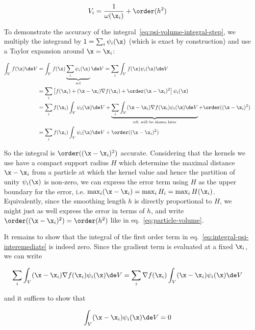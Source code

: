 \begin{align}
    V_i = \frac{1}{\omega(\x_i)} + \order(h^2) \label{eq:particle-volume}
\end{align}

To demonstrate the accuracy of the integral~\ref{eq:psi-volume-integral-step}, we multiply the
integrand by $1 = \sum_i \psi_i(\x)$ (which is exact by construction) and use a Taylor expansion
around $\x = \x_i$:

\begin{align}
    \int_V f(\x) \de V
        &= \int_V f(\x) \underbrace{\sum_i \psi_i(\x)}_{= 1} \de V
        = \sum_i \int_V f(\x) \psi_i(\x) \de V \\
        &= \sum_i \left[
            f(\x_i) + (\x - \x_i)\nabla f(\x_i) + \order(\x - \x_i)^2
            \right] \psi_i (\x) \\
        &= \sum_i f(\x_i) \int_V \psi_i(\x) \de V +
            \underbrace{\sum_i \int_V (\x - \x_i) \nabla f(\x_i) \psi_i(\x) \de V}_{=0 \text{, will
be shown later}} + \order((\x - \x_i)^2) \label{eq:integral-psi-interemediate}\\
        &= \sum_i f(\x_i) \int_V \psi_i(\x) \de V + \order((\x - \x_i)^2)
\end{align}


So the integral is $\order((\x - \x_i)^2)$ accurate. Considering that the kernels we use have a
compact support radius $H$ which determine the maximal distance $\x - \x_i$ from a particle at
which the kernel value and hence the partition of unity $\psi_i(\x)$ is non-zero, we can express
the error term using $H$ as the upper boundary for the error, i.e. $\max_i (\x - \x_i) = \max_i H_i
= \max_i H(\x_i)$. Equivalently, since the smoothing length $h$ is directly proportional to $H$, we
might just as well express the error in terms of $h$, and write $\order((\x - \x_i)^2) =
\order(h^2)$ like in eq.~\ref{eq:particle-volume}.

It remains to show that the integral of the first order term in
eq.~\ref{eq:integral-psi-interemediate} is indeed zero. Since the gradient term is evaluated at a
fixed $\x_i$, we can write

\begin{align}
    \sum_i \int_V (\x - \x_i) \nabla f(\x_i) \psi_i(\x) \de V =
    \sum_i \nabla f(\x_i)  \int_V (\x - \x_i)\psi_i(\x) \de V
\end{align}

and it suffices to show that

\begin{align}
    \int_V (\x - \x_i)\psi_i(\x) \de V = 0
\end{align}

